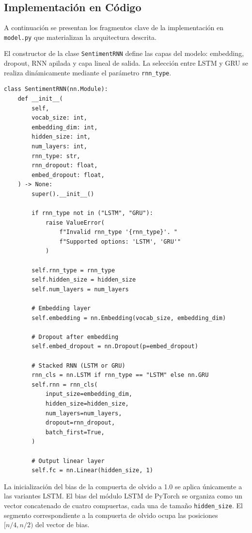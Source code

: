 \subsection{Implementación en Código}

A continuación se presentan los fragmentos clave de la implementación en
\texttt{model.py} que materializan la arquitectura descrita.

El constructor de la clase \texttt{SentimentRNN} define las capas del modelo:
embedding, dropout, RNN apilada y capa lineal de salida. La selección entre
LSTM y GRU se realiza dinámicamente mediante el parámetro \texttt{rnn\_type}.

\begin{verbatim}
class SentimentRNN(nn.Module):
    def __init__(
        self,
        vocab_size: int,
        embedding_dim: int,
        hidden_size: int,
        num_layers: int,
        rnn_type: str,
        rnn_dropout: float,
        embed_dropout: float,
    ) -> None:
        super().__init__()

        if rnn_type not in ("LSTM", "GRU"):
            raise ValueError(
                f"Invalid rnn_type '{rnn_type}'. "
                f"Supported options: 'LSTM', 'GRU'"
            )

        self.rnn_type = rnn_type
        self.hidden_size = hidden_size
        self.num_layers = num_layers

        # Embedding layer
        self.embedding = nn.Embedding(vocab_size, embedding_dim)

        # Dropout after embedding
        self.embed_dropout = nn.Dropout(p=embed_dropout)

        # Stacked RNN (LSTM or GRU)
        rnn_cls = nn.LSTM if rnn_type == "LSTM" else nn.GRU
        self.rnn = rnn_cls(
            input_size=embedding_dim,
            hidden_size=hidden_size,
            num_layers=num_layers,
            dropout=rnn_dropout,
            batch_first=True,
        )

        # Output linear layer
        self.fc = nn.Linear(hidden_size, 1)
\end{verbatim}

La inicialización del bias de la compuerta de olvido a 1.0 se aplica únicamente
a las variantes LSTM. El bias del módulo LSTM de PyTorch se organiza como un
vector concatenado de cuatro compuertas, cada una de tamaño \texttt{hidden\_size}.
El segmento correspondiente a la compuerta de olvido ocupa las posiciones
$[n/4, n/2)$ del vector de bias.


